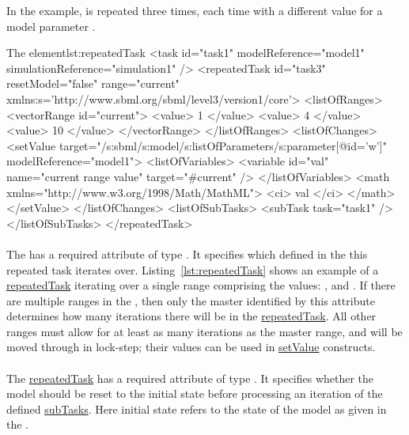 In the example,  is repeated three times, each time with a different value for a model parameter .
\begin{myXmlLst}{The  element}{lst:repeatedTask}
<task id="task1" modelReference="model1" simulationReference="simulation1" />
<repeatedTask id="task3" resetModel="false" range="current"
    xmlns:s='http://www.sbml.org/sbml/level3/version1/core'>
  <listOfRanges>
    <vectorRange id="current"> 
        <value> 1 </value> 
        <value> 4 </value> 
        <value> 10 </value> 
    </vectorRange> 
  </listOfRanges>
  <listOfChanges>
     <setValue target="/s:sbml/s:model/s:listOfParameters/s:parameter[@id='w']" modelReference="model1">
       <listOfVariables> 
         <variable id="val" name="current range value" target="#current" /> 
       </listOfVariables> 
       <math xmlns="http://www.w3.org/1998/Math/MathML"> 
         <ci> val </ci> 
       </math> 
     </setValue> 
  </listOfChanges>
  <listOfSubTasks>
    <subTask task="task1" />
  </listOfSubTasks>
</repeatedTask>
\end{myXmlLst}
 
\paragraph*{}
\label{sec:rangeAttribute}
The \RepeatedTask has a required attribute  of type \SIdRef. It specifies which  defined in the \hyperref[class:listOfRanges]{} this repeated task iterates over. Listing~\ref{lst:repeatedTask} shows an example of a \hyperref[class:repeatedTask]{repeatedTask} iterating over a single range comprising the values: ,  and .
If there are multiple ranges in the \hyperref[class:listOfRanges]{}, then only the master  identified by this attribute determines how many iterations there will be in the \hyperref[class:repeatedTask]{repeatedTask}. All other ranges must allow for at least as many iterations as the master range, and will be moved through in lock-step; their values can be used in \hyperref[class:setValue]{setValue} constructs.

\paragraph*{}
\label{sec:resetModel}
The \hyperref[class:repeatedTask]{repeatedTask} has a required attribute  of type . It specifies whether the model  should be reset to the initial state before processing an iteration of the defined \hyperref[class:subTask]{subTasks}. Here initial state refers to the state of the model  as given in the \hyperref[class:listOfModels]{}.

